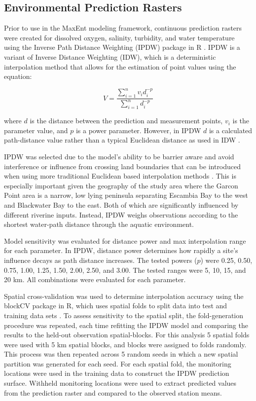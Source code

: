 \documentclass[
  review]{elsarticle}
\begin{document}
\subsection{Environmental Prediction
Rasters}\label{environmental-prediction-rasters}

Prior to use in the MaxEnt modeling framework, continuous prediction
rasters were created for dissolved oxygen, salinity, turbidity, and
water temperature using the Inverse Path Distance Weighting (IPDW)
package in R \citep{IPDW_2023}. IPDW is a variant of Inverse Distance
Weighting (IDW), which is a deterministic interpolation method that
allows for the estimation of point values using the equation:

\[ 
V= \frac{\sum\limits^{n}_{i=1} v_i {d^{-p}_{i}}}{\sum\limits^{n}_{i=1} {d^{-p}_{i}}} 
\]

where \(d\) is the distance between the prediction and measurement
points, \(v_i\) is the parameter value, and \(p\) is a power parameter.
However, in IPDW \(d\) is a calculated path-distance value rather than a
typical Euclidean distance as used in IDW \citep{Stachelek2015}.

IPDW was selected due to the model's ability to be barrier aware and
avoid interference or influence from crossing land boundaries that can
be introduced when using more traditional Euclidean based interpolation
methods \citep{Stachelek2015}. This is especially important given the
geography of the study area where the Garcon Point area is a narrow, low
lying peninsula separating Escambia Bay to the west and Blackwater Bay
to the east. Both of which are significantly influenced by different
riverine inputs. Instead, IPDW weighs observations according to the
shortest water-path distance through the aquatic environment.

Model sensitivity was evaluated for distance power and max interpolation
range for each parameter. In IPDW, distance power determines how rapidly
a site's influence decays as path distance increases. The tested powers
(\(p\)) were 0.25, 0.50, 0.75, 1.00, 1.25, 1.50, 2.00, 2.50, and 3.00.
The tested ranges were 5, 10, 15, and 20 km. All combinations were
evaluated for each parameter.

Spatial cross-validation was used to determine interpolation accuracy
using the blockCV package in R, which uses spatial folds to split data
into test and training data sets \citep{Valavi2019}. To assess
sensitivity to the spatial split, the fold-generation procedure was
repeated, each time refitting the IPDW model and comparing the results
to the held-out observation spatial-blocks. For this analysis 5 spatial
folds were used with 5 km spatial blocks, and blocks were assigned to
folds randomly. This process was then repeated across 5 random seeds in
which a new spatial partition was generated for each seed. For each
spatial fold, the monitoring locations were used in the training data to
construct the IPDW prediction surface. Withheld monitoring locations
were used to extract predicted values from the prediction raster and
compared to the observed station means.
\end{document}
